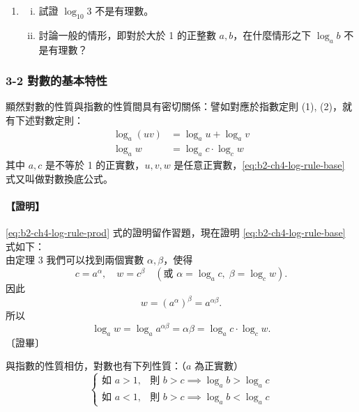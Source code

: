 \begin{enumerate}
\begin{enumerate}[(i)]
        \item $2^x - \frac{1}{10} = 0$。
        \item $3^x - \frac{1}{10} = 0$。
        \item $2^x - 1000 = 0$。
        \item $3^x - \frac{1}{250} = 0$。
    \end{enumerate}
    \item 
    \begin{enumerate}[(i)]
        \item 試證 $\log_{10} 3$ 不是有理數。
        \item 討論一般的情形，即對於大於 1 的正整數 $a, b$，在什麼情形之下 $\log_a b$ 不是有理數？
    \end{enumerate}
\end{enumerate}

\subsubsection*{3-2 對數的基本特性}

顯然對數的性質與指數的性質間具有密切關係：譬如對應於指數定則 (1), (2)，就有下述對數定則：
\begin{align}
\log_a(uv) &= \log_a u + \log_a v \tag{I}\label{eq:b2-ch4-log-rule-prod} \\
\log_a w &= \log_a c \cdot \log_c w \tag{II}\label{eq:b2-ch4-log-rule-base}
\end{align}
其中 $a, c$ 是不等於 1 的正實數，$u, v, w$ 是任意正實數，\eqref{eq:b2-ch4-log-rule-base} 式又叫做對數換底公式。
\paragraph{【證明】} \eqref{eq:b2-ch4-log-rule-prod} 式的證明留作習題，現在證明 \eqref{eq:b2-ch4-log-rule-base} 式如下：\\
由定理 3 我們可以找到兩個實數 $\alpha, \beta$，使得
\[
c = a^\alpha,\quad w = c^\beta \quad (\text{或 } \alpha = \log_a c,\; \beta = \log_c w).
\]
因此
\[
w = (a^\alpha)^\beta = a^{\alpha\beta}.
\]
所以
\[
\log_a w = \log_a a^{\alpha\beta} = \alpha\beta = \log_a c \cdot \log_c w.
\]
\hfill〔證畢〕

與指數的性質相仿，對數也有下列性質：（$a$ 為正實數）
\begin{equation}
\begin{cases}
\text{如 } a > 1, & \text{則 } b > c \implies \log_a b > \log_a c \\
\text{如 } a < 1, & \text{則 } b > c \implies \log_a b < \log_a c
\end{cases} \tag{III}\label{eq:b2-ch4-log-mono}
\end{equation}

